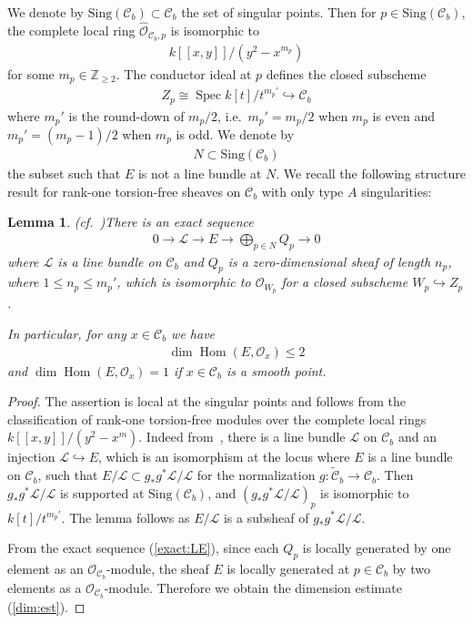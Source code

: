 \documentclass[11pt,oneside,a4paper,mathscr]{amsart}
\newtheorem{lemma}[thm]{Lemma}
\theoremstyle{definition}
\renewcommand{\leq}{\leqslant}
\renewcommand{\geq}{\geqslant}
\newcommand{\cL}{\mathcal{L}}
\newcommand{\cC}{\mathcal{C}}
\newcommand{\cO}{\mathcal{O}}
\newcommand{\Hom}{\operatorname{Hom}}
\newcommand{\Spec}{\operatorname{Spec}}
\begin{document}
We denote by $\mathrm{Sing}(\cC_b) \subset \cC_b$ the set of singular points. 
Then for $p\in \mathrm{Sing}(\cC_b)$, 
the complete local ring $\widehat{\mathcal{O}}_{\cC_b, p}$ is isomorphic to 
\begin{align*}
    k[[x, y]]/(y^2-x^{m_p})
\end{align*}
for some $m_p \in \mathbb{Z}_{\geq 2}$. 
The conductor ideal at $p$ defines the closed subscheme 
\begin{align}\label{def:Zp}
    Z_p \cong \Spec k[t]/t^{m_p'} \hookrightarrow \cC_b
\end{align}
where $m_p'$ is the round-down of $m_p/2$, i.e.\ $m_p'=m_p/2$ when $m_p$ is even and $m_p'=(m_p-1)/2$ when $m_p$ is odd. 
We denote by 
\begin{align*}
    N \subset \mathrm{Sing}(\cC_b)
\end{align*}
the subset such that $E$ is not a line bundle at $N$. We recall the following 
structure result for rank-one torsion-free sheaves on $\cC_b$ with only type $A$ singularities:
\begin{lemma}\emph{(cf.~\cite[Lemma~5.2]{TodaGL2})}\label{lem:Qp}
There is an exact sequence 
\begin{align}\label{exact:LE}
    0\to \mathcal{L} \to E \to \bigoplus_{p\in N}Q_p \to 0
\end{align}
where $\mathcal{L}$ is a line bundle on $\cC_b$ and $Q_p$ is a zero-dimensional sheaf of length $n_p$, 
where $1\leq n_p \leq m_p'$, which is isomorphic to $\mathcal{O}_{W_p}$ for 
a closed subscheme $W_p \hookrightarrow Z_p$. 

In particular, for any $x\in \cC_b$ we have 
\begin{align}\label{dim:est}
    \dim \Hom(E, \mathcal{O}_x) \leq 2
\end{align}
and $\dim \Hom(E, \cO_x)=1$ if $x\in \cC_b$ is a smooth point.  
\end{lemma}
\begin{proof}
The assertion is local at the singular points and follows from the classification of rank-one torsion-free modules over the complete local rings 
$k[[x,y]]/(y^2-x^m)$. Indeed from~\cite[Lemma~4.26]{TodaGL2}, there is a line bundle $\cL$ on $\cC_b$
and an injection $\cL \hookrightarrow E$, which is an isomorphism at 
the locus where $E$ is a line bundle on $\cC_b$, such that 
$E/\cL \subset g_{*}g^* \cL/\cL$ for the normalization $g \colon \widetilde{\cC}_b \to \cC_b$. 
Then $g_{*}g^* \cL/\cL$ is supported at $\mathrm{Sing}(\cC_b)$, and 
$(g_{*}g^*\cL/\cL)_{p}$ is isomorphic to $k[t]/t^{m_p'}$. The lemma follows as $E/\mathcal{L}$ is a subsheaf of $g_{*}g^* \cL/\cL$. 

From the exact sequence (\ref{exact:LE}), since each $Q_p$ is locally generated by one element as an $\mathcal{O}_{\cC_b}$-module, 
the sheaf $E$ is locally generated at $p\in \cC_b$ 
by two elements as a $\cO_{\cC_b}$-module. Therefore we obtain the dimension estimate (\ref{dim:est}). 
\end{proof}
\end{document}
